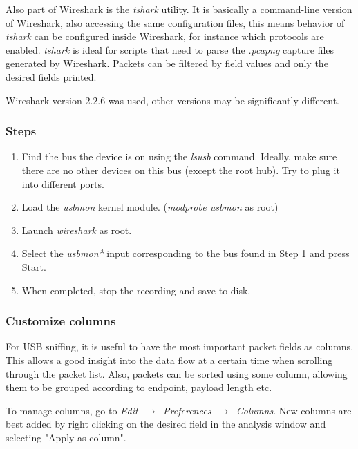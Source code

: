 \documentclass{article}
\begin{document}
Also part of Wireshark is the {\it tshark} \cite{wireshark_tshark} utility. It is basically
a command-line version of Wireshark, also accessing
the same configuration files, this means behavior of {\it tshark} can be configured
inside Wireshark, for instance which protocols are enabled. {\it tshark} is ideal for scripts
that need to parse the {\it .pcapng} capture files generated by Wireshark.
Packets can be filtered by field values and only the desired fields printed.

Wireshark version 2.2.6 was used, other versions may be significantly different.

\subsubsection{Steps}
\label{sniffingprocess}

\begin{enumerate}
  \item Find the bus the device is on using the {\it lsusb} command.
        Ideally, make sure there are no other devices
        on this bus (except the root hub). Try to plug it into different ports.
  
  \item Load the {\it usbmon} kernel module. ({\it modprobe usbmon} as root)
  
  \item Launch {\it wireshark} as root.
  
  \item Select the {\it usbmon*} input corresponding to the bus found in Step 1 and press Start.
  
  \item When completed, stop the recording and save to disk.
  \end{enumerate}

\subsubsection{Customize columns}

For USB sniffing, it is useful to have the most important packet fields as columns.
This allows a good insight into the data flow at a certain time when scrolling through the packet list.
Also, packets can be sorted using some column, allowing them to be grouped according to endpoint,
payload length etc. 

To manage columns, go to {\it Edit $\,\to\,$ Preferences $\,\to\,$ Columns}. New columns are best added
by right clicking on the desired field in the analysis window and selecting "Apply as column".
\end{document}
